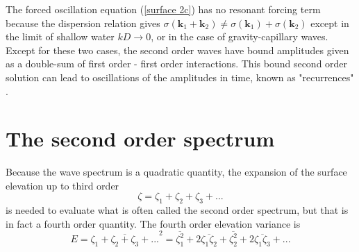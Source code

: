 The forced oscillation equation (\ref{surface 2c}) has no resonant forcing term because the dispersion relation 
gives
$\sigma\left({\mathbf k_1}+{\mathbf k_2}\right)
    \neq \sigma\left({\mathbf k_1}\right)+\sigma\left({\mathbf k_2}\right)$ except in the limit of shallow 
water  $kD \rightarrow 0$, or in the case of gravity-capillary waves. Except for these two cases, the second order waves have bound amplitudes given as a double-sum of first order - first order interactions. This bound 
second order solution can lead to oscillations of the amplitudes in time, known as "recurrences" \citep{Fermi&al.1955}.



\section{The second order spectrum}
Because the wave spectrum is a quadratic quantity, the expansion of the surface elevation up to third order 
\begin{equation}
 \zeta= \zeta_1 + \zeta_2 + \zeta_3 + ...
\end{equation}
is needed to evaluate what is often called the second order spectrum, but that is in fact a fourth order quantity. The fourth 
order elevation variance is 
\begin{equation}
 E= \overline{\zeta_1 + \zeta_2 + \zeta_3+ ...}^2  = \overline{\zeta_1^2} + 2 \overline{\zeta_1 \zeta_2} +\overline{\zeta_2^2} + 2 \overline{\zeta_1 \zeta_3} + ... 
\end{equation}


